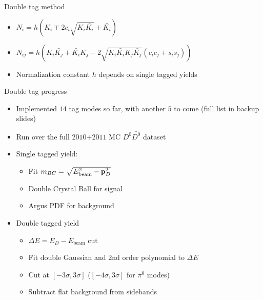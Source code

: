 \documentclass{beamer}
\begin{document}
\begin{frame}{Double tag method}
  \begin{itemize}
    \setlength\itemsep{1.3em}
    \item{$N_i = h(K_i \mp 2c_i\sqrt{K_i\bar{K_i}} + \bar{K_i})$}
    \item{$N_{ij} = h(K_i\bar{K_j} + \bar{K_i}K_j - 2\sqrt{K_i\bar{K_i}K_j\bar{K_j}}(c_ic_j + s_is_j))$}
    \item{Normalization constant $h$ depends on single tagged yields}
  \end{itemize}
\end{frame}

\begin{frame}{Double tag progress}
  \begin{itemize}
    \setlength\itemsep{1.2em}
    \item{Implemented $14$ tag modes so far, with another $5$ to come (full list in backup slides)}
    \item{Run over the full $2010$+$2011$ MC $D^0\bar{D^0}$ dataset}
    \item{Single tagged yield:}
    \begin{itemize}
      \item{Fit $m_{BC} = \sqrt{E_\text{beam}^2 - \vb{p}_D^2}$}
      \item{Double Crystal Ball for signal}
      \item{Argus PDF for background}
    \end{itemize}
    \item{Double tagged yield}
    \begin{itemize}
      \item{$\Delta E = E_D - E_\text{beam}$ cut}
      \item{Fit double Gaussian and 2nd order polynomial to $\Delta E$}
      \item{Cut at $[-3\sigma, 3\sigma]$ ($[-4\sigma, 3\sigma]$ for $\pi^0$ modes)}
      \item{Subtract flat background from sidebands}
    \end{itemize}
  \end{itemize}
\end{frame}
\end{document}
